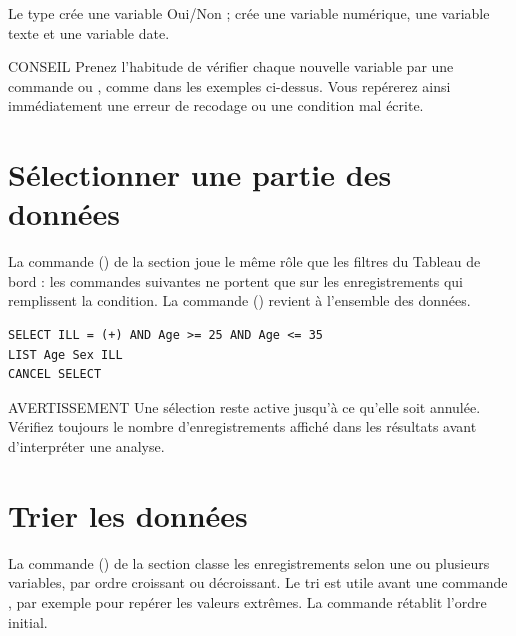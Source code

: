 Le type  crée une variable Oui/Non ;  crée une variable numérique,  une variable texte et  une variable date.

\begin{mybox}[colbacktitle=TIP]{\faLightbulb{} CONSEIL}
Prenez l'habitude de vérifier chaque nouvelle variable par une commande  ou , comme dans les exemples ci-dessus. Vous repérerez ainsi immédiatement une erreur de recodage ou une condition mal écrite.
\end{mybox}

\section{Sélectionner une partie des données}

La commande  () de la section  joue le même rôle que les filtres du Tableau de bord : les commandes suivantes ne portent que sur les enregistrements qui remplissent la condition. La commande  () revient à l'ensemble des données.

\begin{tcolorbox}
	\begin{lstlisting}[language=EPIscript, style=mystyle, caption={Sélection des malades âgés de 25 à 35 ans}, label=lst:select]
SELECT ILL = (+) AND Age >= 25 AND Age <= 35
LIST Age Sex ILL
CANCEL SELECT
	\end{lstlisting}
\end{tcolorbox}

\begin{mybox}[colbacktitle=CAUTION]{\faFire{} AVERTISSEMENT}
Une sélection reste active jusqu'à ce qu'elle soit annulée. Vérifiez toujours le nombre d'enregistrements affiché dans les résultats avant d'interpréter une analyse.
\end{mybox}

\section{Trier les données}

La commande  () de la section  classe les enregistrements selon une ou plusieurs variables, par ordre croissant ou décroissant. Le tri est utile avant une commande , par exemple pour repérer les valeurs extrêmes. La commande  rétablit l'ordre initial.

